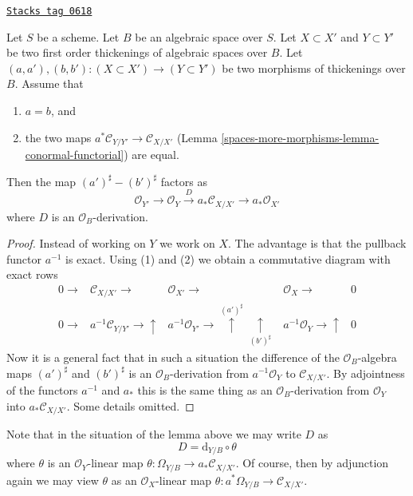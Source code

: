 \begin{lemma}
\label{spaces-more-morphisms-lemma-difference-derivation}
\href{https://stacks.math.columbia.edu/tag/0618}{\texttt{Stacks tag 0618}}

Let $S$ be a scheme. Let $B$ be an algebraic space over $S$.
Let $X \subset X'$ and $Y \subset Y'$ be two first order thickenings
of algebraic spaces over $B$.
Let $(a, a'), (b, b') : (X \subset X') \to (Y \subset Y')$
be two morphisms of thickenings over $B$. Assume that
\begin{enumerate}
\item $a = b$, and
\item the two maps $a^*\mathcal{C}_{Y/Y'} \to \mathcal{C}_{X/X'}$
(Lemma \ref{spaces-more-morphisms-lemma-conormal-functorial})
are equal.
\end{enumerate}
Then the map $(a')^\sharp - (b')^\sharp$ factors as
$$
\mathcal{O}_{Y'} \to \mathcal{O}_Y \xrightarrow{D}
a_*\mathcal{C}_{X/X'} \to a_*\mathcal{O}_{X'}
$$
where $D$ is an $\mathcal{O}_B$-derivation.
\end{lemma}

\begin{proof}
Instead of working on $Y$ we work on $X$. The advantage is that the pullback
functor $a^{-1}$ is exact. Using (1) and (2) we obtain a commutative diagram
with exact rows
$$
\begin{array}{ccccc}0 \longrightarrow & \mathcal{C}_{X/X'} \longrightarrow & \mathcal{O}_{X'} \longrightarrow & \mathcal{O}_X \longrightarrow & 0 \\ 0 \longrightarrow & a^{-1}\mathcal{C}_{Y/Y'} \longrightarrow\uparrow & a^{-1}\mathcal{O}_{Y'}
\longrightarrow\overset{(a')^\sharp}{\uparrow}\underset{(b')^\sharp}{\uparrow} & a^{-1}\mathcal{O}_Y \longrightarrow\uparrow & 0\end{array}
$$
Now it is a general fact that in such a situation the difference of the
$\mathcal{O}_B$-algebra maps $(a')^\sharp$ and $(b')^\sharp$ is an
$\mathcal{O}_B$-derivation from $a^{-1}\mathcal{O}_Y$ to $\mathcal{C}_{X/X'}$.
By adjointness of the functors $a^{-1}$ and $a_*$ this is the same
thing as an $\mathcal{O}_B$-derivation from
$\mathcal{O}_Y$ into $a_*\mathcal{C}_{X/X'}$. Some details omitted.
\end{proof}

Note that in the situation of the lemma above we may write
$D$ as
\begin{equation}
\label{equation-D}
D = \text{d}_{Y/B} \circ \theta
\end{equation}
where $\theta$ is an $\mathcal{O}_Y$-linear map
$\theta : \Omega_{Y/B} \to a_*\mathcal{C}_{X/X'}$.
Of course, then by adjunction again we may view $\theta$ as an
$\mathcal{O}_X$-linear map
$\theta : a^*\Omega_{Y/B} \to \mathcal{C}_{X/X'}$.

